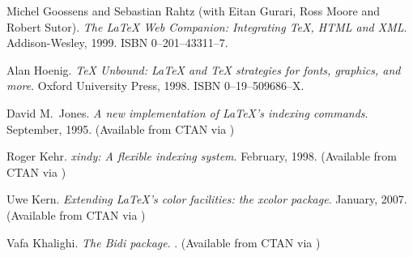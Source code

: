 \begin{thebibliography}{GMS94A}
  Michel Goossens and Sebastian Rahtz (with Eitan Gurari,
  Ross Moore and Robert Sutor).
  \newblock \emph{The LaTeX Web Companion: Integrating TeX, HTML and XML}.
  \newblock Addison-Wesley, 1999.
  \newblock ISBN 0--201--43311--7.

\begin{comment}
\bibitem[Gou87]{GOULD87}
  J.~D.~Gould \textit{et al}.
  \newblock `Reading from CRT displays can be as fast as reading from paper'.
  \newblock \emph{Human Factors}, pp 497--517, 29:5, 1987.

\bibitem[HR83]{HARTLEY83}
  J.~Hartley and D.~Rooum.
  \newblock `Sir Cyril Burt and typography'.
  \newblock \emph{British Journal of Psychology}, pp 203--212, 74:2, 1983.

\bibitem[HM01]{HELLER01}
  Steven Heller and Philip B.~Meggs (Eds).
  \newblock \emph{Texts on Type: Critical Writings on Typography}.
  \newblock Allworth Press, 2001.
  \newblock ISBN 1--58115--082--2.
\end{comment}

  Alan Hoenig.
  \newblock \emph{TeX Unbound: LaTeX and TeX strategies for fonts,
                  graphics, and more}.
  \newblock Oxford University Press, 1998.
  \newblock ISBN 0--19--509686--X.

\begin{comment}
\bibitem[HK75]{HVISTENDAHL75}
  J.~K.~Hvistendahl and M.~R.~Kahl.
  \newblock `Roman vs. sans serif body type: Readability and reader prference'.
  \newblock \emph{AANPA News Research Bulletin}, pp 3--11, 17 Jan., 1975.
\end{comment}

  David M.~Jones.
  \newblock \emph{A new implementation of LaTeX's indexing commands}.
  \newblock September, 1995.
  \newblock (Available from CTAN via 
  )

  Roger Kehr.
  \newblock \emph{xindy: A flexible indexing system}.
  \newblock February, 1998.
  \newblock (Available from CTAN via )

  Uwe Kern.
  \newblock \emph{Extending LaTeX's color facilities: the xcolor package}.
  \newblock January, 2007.
  \newblock (Available from CTAN via 
             )

 Vafa
  Khalighi.  
  \newblock \emph{The \textsf{Bidi} package}.
  .  \newblock (Available from CTAN via
  )




\end{thebibliography}
